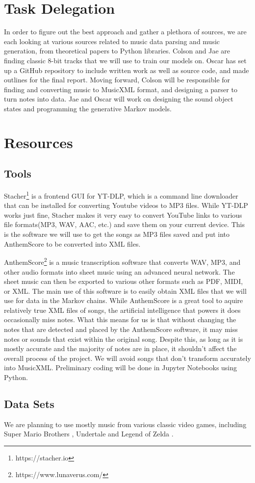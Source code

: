 \documentclass{article}
\begin{document}
\section{Task Delegation}
In order to figure out the best approach and gather a plethora of sources, we are each looking at various sources related to music data parsing and music generation, 
from theoretical papers to Python libraries. Colson and Jae are finding classic 8-bit tracks that we will use to train our models on. Oscar has set up a GitHub repository 
to include written work as well as source code, and made outlines for the final report. Moving forward, Colson will be responsible for finding and converting music to 
MusicXML format, and designing a parser to turn notes into data. Jae and Oscar will work on designing the sound object states and programming the generative Markov models. 

\section{Resources}
\subsection{Tools}
Stacher\footnote{https://stacher.io} is a frontend GUI for YT-DLP, which is a command line downloader that can be installed for converting Youtube videos to MP3 files.
While YT-DLP works just fine, Stacher makes it very easy to convert YouTube links to various file formats(MP3, WAV, AAC, etc.) and save them on your current device. This is 
the software we will use to get the songs as MP3 files saved and put into AnthemScore to be converted into XML files.

AnthemScore\footnote{https://www.lunaverus.com/} is a music transcription software that converts WAV, MP3, and other audio formats into sheet music using an advanced neural 
network. The sheet music can then be exported to various other formats such as PDF, MIDI, or XML. The main use of this software is to easily obtain XML files that we will 
use for data in the Markov chains. While AnthemScore is a great tool to aquire relatively true XML files of songs, the artificial intelligence that powers it does occasionally 
miss notes. What this means for us is that without changing the notes that are detected and placed by the AnthemScore software, it may miss notes or sounds that exist within 
the original song. Despite this, as long as it is mostly accurate and the majority of notes are in place, it shouldn't affect the overall process of the project. We will avoid 
songs that don't transform accurately into MusicXML. Preliminary coding will be done in Jupyter Notebooks using Python. 

\subsection{Data Sets}
We are planning to use mostly music from various classic video games, including Super Mario Brothers \cite{kondo_2009},
Undertale \cite{fox_2017} and Legend of Zelda \cite{nakatsuka_2009}.



\end{document}
